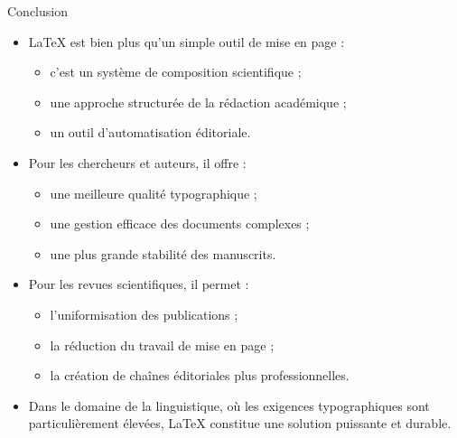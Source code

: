 \documentclass[aspectratio=169]{beamer}
\begin{document}
	\begin{frame}{Conclusion}
		\begin{itemize}
			\item \LaTeX{} est bien plus qu’un simple outil de mise en page :
			\begin{itemize}
				\item c’est un système de composition scientifique ;
				\item une approche structurée de la rédaction académique ;
				\item un outil d’automatisation éditoriale.
			\end{itemize}
			
			\vspace{0.4cm}
			
			\item Pour les chercheurs et auteurs, il offre :
			\begin{itemize}
				\item une meilleure qualité typographique ;
				\item une gestion efficace des documents complexes ;
				\item une plus grande stabilité des manuscrits.
			\end{itemize}
			
			\vspace{0.4cm}
			
			\item Pour les revues scientifiques, il permet :
			\begin{itemize}
				\item l’uniformisation des publications ;
				\item la réduction du travail de mise en page ;
				\item la création de chaînes éditoriales plus professionnelles.
			\end{itemize}
			
			\vspace{0.4cm}
			
			\item Dans le domaine de la linguistique, où les exigences typographiques sont particulièrement élevées, \LaTeX{} constitue une solution puissante et durable.
		\end{itemize}
	\end{frame}
	
	
\end{document}

